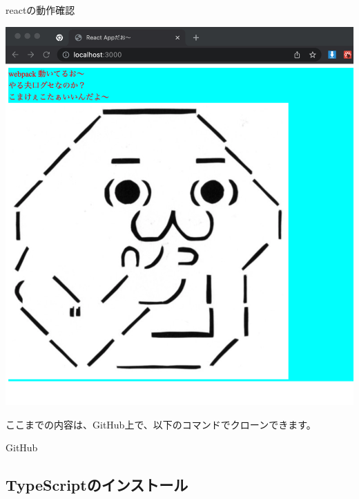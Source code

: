 \def\startercodeblockfontsize{}
\begin{starterterminal}[]{reactの動作確認}\end{starterterminal}
\begin{reviewimage}%
\includegraphics[width=0.7\maxwidth]{./images/02-create-react-app/babel09.png}%
\label{image:02-create-react-app:babel09}
\end{reviewimage}
\begin{starternote}[]{}

ここまでの内容は、GitHub上で、以下のコマンドでクローンできます。

\def\startercodeblockfontsize{}
\begin{starterterminal}[]{GitHub}\end{starterterminal}
\end{starternote}

\subsection{TypeScriptのインストール}
\keeplastskip{
  \label{sec:2-2-8}
  \label{sec04-typescript}
  \par\nobreak
}

